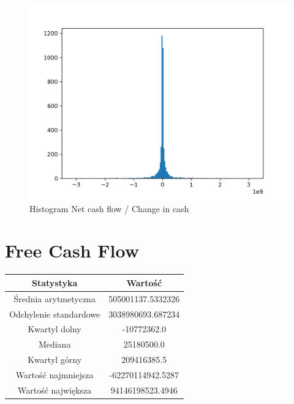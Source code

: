 \documentclass{article}
\begin{document}
\begin{figure}[h!]
    \includegraphics[width=\linewidth]{variables/Net cash flow _ Change in cash.png}
    \caption{Histogram Net cash flow / Change in cash }
\end{figure}\section{ Free Cash Flow }

\begin{center}
    \begin{tabular}{|c | c|} 
    \hline
    Statystyka & Wartość \\
    \hline\hline
    Średnia arytmetyczna & 505001137.5332326 \\ 
    \hline
    Odchylenie standardowe & 3038980693.687234 \\
    \hline
    Kwartyl dolny & -10772362.0 \\
    \hline
    Mediana & 25180500.0 \\
    \hline
    Kwartyl górny & 209416385.5 \\
    \hline
    Wartość najmniejsza & -62270114942.5287 \\
    \hline
    Wartość największa & 94146198523.4946 \\
    \hline
   \end{tabular}
\end{center}
\end{document}
